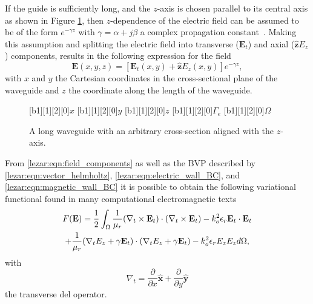 If the guide is sufficiently long, and the $z$-axis is chosen parallel
to its central axis as shown in Figure \ref{lezar:fig:long_waveguide}, then
$z$-dependence of the electric field can be assumed to be of the form
$e^{-\gamma z}$ with $\gamma = \alpha + j\beta$ a complex
propagation constant~\cite{PelCoc1998,
Poz2005}.  Making this assumption and splitting the electric field
into transverse ($\mathbf{E}_t$) and axial ($\hat{\mathbf{z}}E_z$) components,
results in the following expression for the field
\begin{equation}
    \label{lezar:eqn:field_components}
    \mathbf{E}(x,y,z) = [\mathbf{E}_t(x,y) + \hat{\mathbf{z}}E_z(x,y)]e^{-\gamma z},
\end{equation}
with $x$ and $y$ the Cartesian coordinates in the cross-sectional plane of the
waveguide and $z$ the coordinate along the length of the waveguide.

\begin{figure}
 \centering
 [b1][1][2][0]{$x$}
 [b1][1][2][0]{$y$}
 [b1][1][2][0]{$z$}
 [b1][1][2][0]{$\Gamma_{e}$}
 [b1][1][2][0]{$\Omega$}
 \caption{A long waveguide with an arbitrary cross-section aligned with the $z$-axis.}
 \label{lezar:fig:long_waveguide}
\end{figure}

From \eqref{lezar:eqn:field_components} as well as the BVP described by
\eqref{lezar:eqn:vector_helmholtz}, \eqref{lezar:eqn:electric_wall_BC}, and
\eqref{lezar:eqn:magnetic_wall_BC} it is possible to obtain the following
variational functional found in many computational electromagnetic
texts
\cite{Jin2002, PelCoc1998}
\begin{multline}
    \label{lezar:eqn:functional}
    F(\mathbf{E}) = \frac{1}{2}\int_{\Omega}\frac{1}{\mu_r}(\curl{\mathbf{E}_t}{t})\cdot(\curl{\mathbf{E}_t}{t}) -k_o^2\epsilon_r\mathbf{E}_t\cdot{\mathbf{E}_t}\\
    +\frac{1}{\mu_r}(\nabla_t{E_z} + \gamma\mathbf{E}_t)\cdot(\nabla_t{E_z} + \gamma\mathbf{E}_t)
    -k_o^2\epsilon_r E_z{E_z} d\Omega,
\end{multline}
with 
\begin{equation}
    \nabla_t = \frac{\partial}{\partial x}\hat{\mathbf{x}} + \frac{\partial}{\partial
    y}\hat{\mathbf{y}}
\end{equation}
the transverse del operator.

